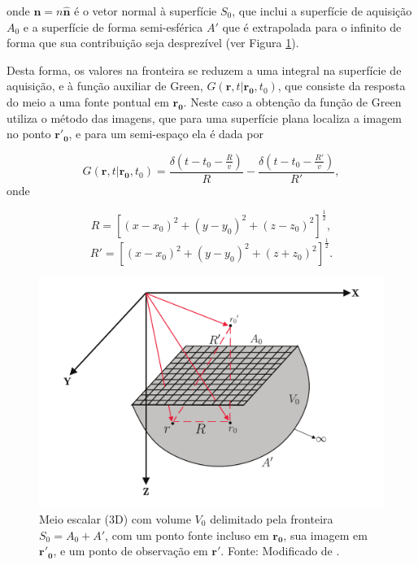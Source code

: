 onde $\mathbf{n}= n\hat{\mathbf{n}}$ é o vetor normal à superfície $S_0$, que inclui a superfície de aquisição $A_0$ e a superfície de forma semi-esférica $A'$ que é extrapolada para o infinito de forma que sua contribuição seja desprezível (ver Figura \ref{fig:migracao_kir1}).

Desta forma, os valores na fronteira se reduzem a uma integral na superfície de aquisição, e à função auxiliar de Green, $G(\mathbf{r},t|\mathbf{r_0},t_0)$, que consiste da resposta do meio a uma fonte pontual em $\mathbf{r_0}$. 
Neste caso a obtenção da função de Green utiliza o método das imagens, que para uma superfície plana localiza a imagem no ponto $\mathbf{r'_0}$, e para um semi-espaço ela é dada por 

\begin{equation}
G(\mathbf{r},t|\mathbf{r_0},t_0)=\frac{\delta(t-t_{0}-\frac{R}{v})}{R}-\frac{\delta(t-t_{0}-\frac{R'}{v})}{R'},
\label{eq:mig_kirchhoff_3}
\end{equation}
onde

\begin{equation}
R=[(x-x_0)^2+(y-y_0)^2+(z-z_0)^2]^{\frac{1}{2}},
\label{eq:mig_kirchhoff_4}
\end{equation}
\begin{equation}
R'=[(x-x_0)^2+(y-y_0)^2+(z+z_0)^2]^{\frac{1}{2}}.
\label{eq:mig_kirchhoff_5}
\end{equation}


\begin{figure}[H]
\centering
\includegraphics[totalheight=9.0cm]{figuras/cap3/migracao_kir1.pdf}
\caption{Meio escalar (3D) com volume $V_0$ delimitado pela fronteira $S_0 = A_0 + A'$, com um ponto fonte incluso em $\mathbf{r_0}$, sua imagem em $\mathbf{r'_0}$, e um ponto de observação em 
$\mathbf{r'}$. Fonte: Modificado de \citep{Schneider(1978)}.}
\label{fig:migracao_kir1}
\end{figure}

